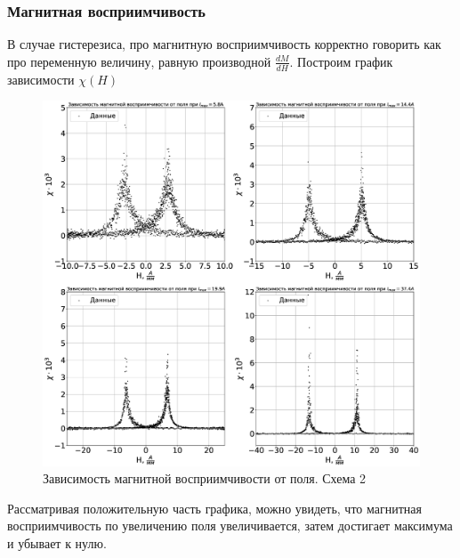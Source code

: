 \documentclass[a4paper,14pt]{extarticle}
\begin{document}
			\subsubsection{Магнитная восприимчивость}
				В случае гистерезиса, про магнитную восприимчивость корректно говорить как про переменную величину, равную производной $\frac{dM}{dH}$. Построим график зависимости $\chi(H)$
				\begin{figure}[h!]
					\centering
					\includegraphics[width=1.0\linewidth]{Lab2_5.eps}
					\caption{Зависимость магнитной восприимчивости от поля. Схема 2}
					\label{fig8}
				\end{figure}
				\newpage
				Рассматривая положительную часть графика, можно увидеть, что магнитная восприимчивость по увеличению поля увеличивается, затем достигает максимума и убывает к нулю.
\end{document}
